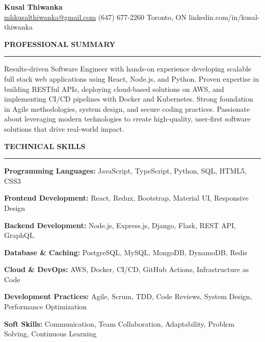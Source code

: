 \documentclass[10pt,letterpaper]{article}
\begin{document}
\begin{center}
{\LARGE\textbf{Kusal Thiwanka}}\\[3pt]
\href{mailto:mhkusalthiwanka@gmail.com}{mhkusalthiwanka@gmail.com}\hspace{2em}%
(647) 677{-}2260\hspace{2em}%
Toronto, ON\hspace{2em}
linkedin.com/in/kusal-thiwanka
\end{center}

\vspace{6pt}

\textbf{PROFESSIONAL SUMMARY}\\[-8pt]
\noindent\rule{\textwidth}{1pt}

\vspace{-2pt}

Results-driven Software Engineer with hands-on experience developing scalable full stack web applications using React, Node.js, and Python. Proven expertise in building RESTful APIs, deploying cloud-based solutions on AWS, and implementing CI/CD pipelines with Docker and Kubernetes. Strong foundation in Agile methodologies, system design, and secure coding practices. Passionate about leveraging modern technologies to create high-quality, user-first software solutions that drive real-world impact.

\vspace{8pt}

\textbf{TECHNICAL SKILLS}\\[-8pt]
\noindent\rule{\textwidth}{1pt}

\vspace{-2pt}

\textbf{Programming Languages:} JavaScript, TypeScript, Python, SQL, HTML5, CSS3

\textbf{Frontend Development:} React, Redux, Bootstrap, Material UI, Responsive Design

\textbf{Backend Development:} Node.js, Express.js, Django, Flask, REST API, GraphQL

\textbf{Database \& Caching:} PostgreSQL, MySQL, MongoDB, DynamoDB, Redis

\textbf{Cloud \& DevOps:} AWS, Docker, CI/CD, GitHub Actions, Infrastructure as Code

\textbf{Development Practices:} Agile, Scrum, TDD, Code Reviews, System Design, Performance Optimization

\textbf{Soft Skills:} Communication, Team Collaboration, Adaptability, Problem Solving, Continuous Learning
\end{document}
